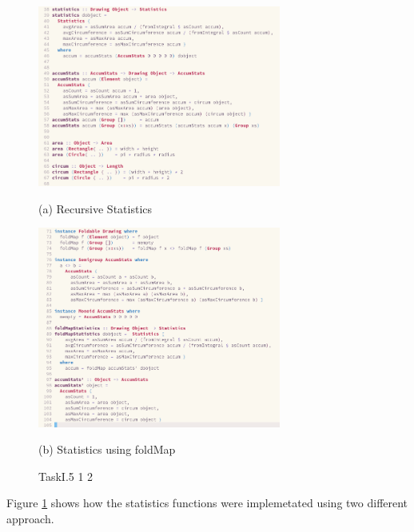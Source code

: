 \documentclass{article}
\begin{document}
\begin{normalsize}
\begin{figure}[H]
    \begin{minipage}[b]{0.48\linewidth}
      \centering
      \centerline{\includegraphics[width=8.0cm]{Stats}}
      \centerline{ (a) Recursive Statistics}\medskip
    \end{minipage}
    \hfill
    \begin{minipage}[b]{0.48\linewidth}
      \centering
      \centerline{\includegraphics[width=8.0cm]{StatsFoldMap}}
      \centerline{ (b) Statistics using foldMap}\medskip
    \end{minipage}
    \caption{TaskI.5 1 2}
    \label{fig:taskI.5.1.2}
  \end{figure}

  Figure \ref{fig:taskI.5.1.2} shows how the statistics functions were
  implemetated using two different approach.


  \begin{figure}[H]


\end{figure}
\end{normalsize}
\end{document}
